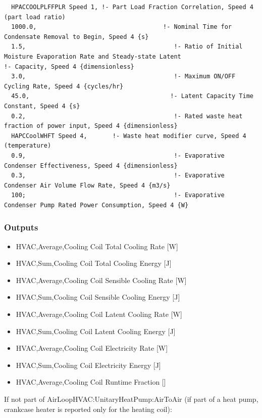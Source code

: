\begin{lstlisting}
  HPACCOOLPLFFPLR Speed 1, !- Part Load Fraction Correlation, Speed 4 (part load ratio)
  1000.0,                                   !- Nominal Time for Condensate Removal to Begin, Speed 4 {s}
  1.5,                                         !- Ratio of Initial Moisture Evaporation Rate and Steady-state Latent                                                     !- Capacity, Speed 4 {dimensionless}
  3.0,                                         !- Maximum ON/OFF Cycling Rate, Speed 4 {cycles/hr}
  45.0,                                       !- Latent Capacity Time Constant, Speed 4 {s}
  0.2,                                         !- Rated waste heat fraction of power input, Speed 4 {dimensionless}
  HAPCCoolWHFT Speed 4,       !- Waste heat modifier curve, Speed 4 (temperature)
  0.9,                                         !- Evaporative Condenser Effectiveness, Speed 4 {dimensionless}
  0.3,                                         !- Evaporative Condenser Air Volume Flow Rate, Speed 4 {m3/s}
  100;                                         !- Evaporative Condenser Pump Rated Power Consumption, Speed 4 {W}
\end{lstlisting}

\subsubsection{Outputs}\label{outputs-12-002}

\begin{itemize}
\item
  HVAC,Average,Cooling Coil Total Cooling Rate {[}W{]}
\item
  HVAC,Sum,Cooling Coil Total Cooling Energy {[}J{]}
\item
  HVAC,Average,Cooling Coil Sensible Cooling Rate {[}W{]}
\item
  HVAC,Sum,Cooling Coil Sensible Cooling Energy {[}J{]}
\item
  HVAC,Average,Cooling Coil Latent Cooling Rate {[}W{]}
\item
  HVAC,Sum,Cooling Coil Latent Cooling Energy {[}J{]}
\item
  HVAC,Average,Cooling Coil Electricity Rate {[}W{]}
\item
  HVAC,Sum,Cooling Coil Electricity Energy {[}J{]}
\item
  HVAC,Average,Cooling Coil Runtime Fraction {[]}
\end{itemize}

If not part of AirLoopHVAC:UnitaryHeatPump:AirToAir (if part of a heat pump, crankcase heater is reported only for the heating coil):

